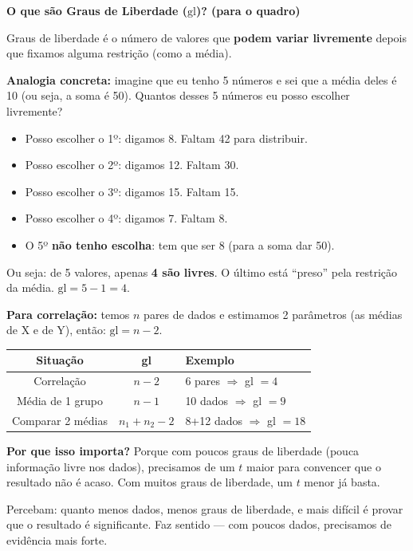\begin{BoardBox}
\textbf{O que são Graus de Liberdade ($\text{gl}$)? (para o quadro)}

Graus de liberdade é o número de valores que \textbf{podem variar
livremente} depois que fixamos alguma restrição (como a média).

\textbf{Analogia concreta:}
imagine que eu tenho 5 números e sei que a média deles é 10
(ou seja, a soma é 50). Quantos desses 5 números eu posso escolher
livremente?

\begin{itemize}
  \item Posso escolher o 1º: digamos 8. Faltam 42 para distribuir.
  \item Posso escolher o 2º: digamos 12. Faltam 30.
  \item Posso escolher o 3º: digamos 15. Faltam 15.
  \item Posso escolher o 4º: digamos 7. Faltam 8.
  \item O 5º \textbf{não tenho escolha}: tem que ser 8 (para a soma dar 50).
\end{itemize}

Ou seja: de 5 valores, apenas \textbf{4 são livres}. O último está
``preso'' pela restrição da média.
$\text{gl} = 5 - 1 = 4$.

\textbf{Para correlação:} temos $n$ pares de dados e estimamos 2 parâmetros
(as médias de X e de Y), então: $\text{gl} = n - 2$.

\medskip
\begin{tabular}{|c|c|l|}
\hline
\textbf{Situação} & \textbf{gl} & \textbf{Exemplo} \\
\hline
Correlação & $n - 2$ & 6 pares $\Rightarrow$ gl $= 4$ \\
Média de 1 grupo & $n - 1$ & 10 dados $\Rightarrow$ gl $= 9$ \\
Comparar 2 médias & $n_1 + n_2 - 2$ & 8+12 dados $\Rightarrow$ gl $= 18$ \\
\hline
\end{tabular}

\medskip
\textbf{Por que isso importa?} Porque com poucos graus de liberdade
(pouca informação livre nos dados), precisamos de um $t$ maior para
convencer que o resultado não é acaso. Com muitos graus de liberdade,
um $t$ menor já basta.
\end{BoardBox}

Percebam: quanto menos dados, menos graus de liberdade, e mais difícil
é provar que o resultado é significante. Faz sentido — com poucos dados,
precisamos de evidência mais forte.

